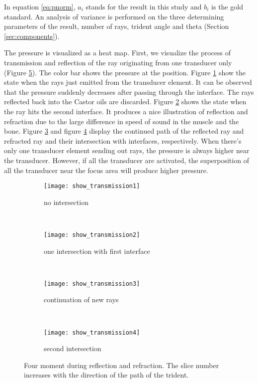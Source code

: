 In equation \ref{eq:pnorm}, $a_i$ stands for the result in this study and $b_i$ is the gold standard. An analysis of variance is performed on the three determining parameters of the result, number of rays, trident angle and theta (Section \ref{sec:components}).

The pressure is visualized as a heat map. First, we visualize the process of transmission and reflection of the ray originating from one transducer only (Figure \ref{fig:4reflection}). The color bar shows the pressure at the position. Figure \ref{fig:4reflection-a} show the state when the rays just emitted from the transducer element. It can be observed that the pressure suddenly decreases after passing through the interface. The rays reflected back into the Castor oils are discarded. Figure \ref{fig:4reflection-b} shows the state when the ray hits the second interface. It produces a nice illustration of reflection and refraction due to the large difference in speed of sound in the muscle and the bone. Figure \ref{fig:4reflection-c} and figure \ref{fig:4reflection-d} display the continued path of the reflected ray and refracted ray and their intersection with interfaces, respectively. When there's only one transducer element sending out rays, the pressure is always higher near the transducer. However, if all the transducer are activated, the superposition of all the transducer near the focus area will produce higher pressure.

\begin{figure}[h]
    \centering
    \begin{subfigure}[b]{0.45\textwidth}
        \texttt{[image: show\_transmission1]}
        \caption{no intersection}
        \label{fig:4reflection-a}
    \end{subfigure}
    ~ %
    \begin{subfigure}[b]{0.45\textwidth}
        \texttt{[image: show\_transmission2]}
        \caption{one intersection with first interface}
        \label{fig:4reflection-b}
    \end{subfigure}
    ~ %
    \begin{subfigure}[b]{0.45\textwidth}
        \texttt{[image: show\_transmission3]}
        \caption{continuation of new rays}
        \label{fig:4reflection-c}
    \end{subfigure}
    ~ %
    \begin{subfigure}[b]{0.45\textwidth}
        \texttt{[image: show\_transmission4]}
        \caption{second intersection}
        \label{fig:4reflection-d}
    \end{subfigure}
    \caption{Four moment during reflection and refraction. The slice number increases with the direction of the path of the trident.} \label{fig:4reflection}
\end{figure}

